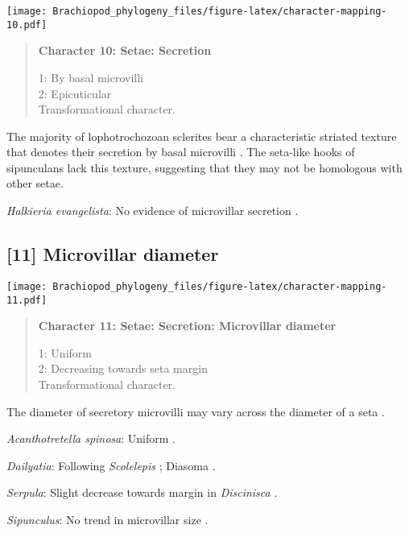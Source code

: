 \documentclass[openany]{book}
\theoremstyle{definition}
\theoremstyle{definition}
\theoremstyle{definition}
\theoremstyle{remark}
\begin{document}
\texttt{[image: Brachiopod\_phylogeny\_files/figure-latex/character-mapping-10.pdf]}

\begin{quote}
\textbf{Character 10: Setae: Secretion}

1: By basal microvilli\\
2: Epicuticular\\
Transformational character.
\end{quote}

The majority of lophotrochozoan sclerites bear a characteristic striated
texture that denotes their secretion by basal microvilli
\citep{Butterfield1990}. The seta-like hooks of sipunculans lack this
texture, suggesting that they may not be homologous with other setae.

\hypertarget{Halkieria_evangelista-coding-10}{}
\emph{Halkieria evangelista}: No evidence of microvillar secretion
\citep[e.g.][]{Schulze2005}.

\subsection*{{[}11{]} Microvillar diameter}\label{microvillar-diameter}

\texttt{[image: Brachiopod\_phylogeny\_files/figure-latex/character-mapping-11.pdf]}

\begin{quote}
\textbf{Character 11: Setae: Secretion: Microvillar diameter}

1: Uniform\\
2: Decreasing towards seta margin\\
Transformational character.
\end{quote}

The diameter of secretory microvilli may vary across the diameter of a
seta \citep{Smith2014}.

\hypertarget{Acanthotretella_spinosa-coding-11}{}
\emph{Acanthotretella spinosa}: Uniform \citep{Fischer1980, Leise1982}.

\hypertarget{Dailyatia-coding-11}{}
\emph{Dailyatia}: Following \emph{Scolelepis} \citep{Hausen2005};
Diasoma \citep{Orrhage1971}.

\hypertarget{Serpula-coding-11}{}
\emph{Serpula}: Slight decrease towards margin in \emph{Discinisca}
\citep{Luter2003}.

\hypertarget{Sipunculus-coding-11}{}
\emph{Sipunculus}: No trend in microvillar size \citep{Gordon1975}.
\end{document}
